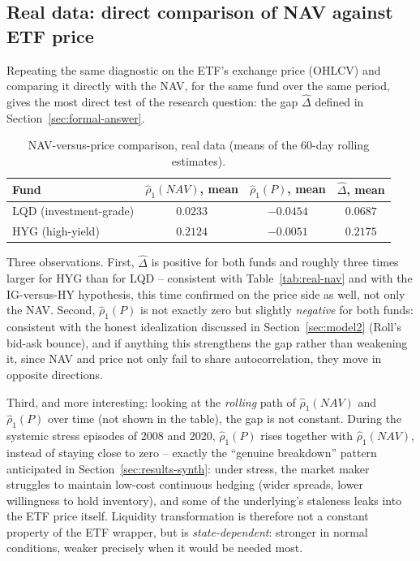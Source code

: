 \documentclass[11pt]{article}
\begin{document}
\subsection{Real data: direct comparison of NAV against ETF price}
\label{sec:results-gap}

Repeating the same diagnostic on the ETF's exchange price (OHLCV) and comparing it directly with the NAV, for the same fund over the same period, gives the most direct test of the research question: the gap $\widehat\Delta$ defined in Section~\ref{sec:formal-answer}.

\begin{table}[H]
\centering
\caption{NAV-versus-price comparison, real data (means of the 60-day rolling estimates).}
\label{tab:real-gap}
\begin{tabular}{lccc}
\toprule
Fund & $\hat\rho_1(NAV)$, mean & $\hat\rho_1(P)$, mean & $\widehat\Delta$, mean \\
\midrule
LQD (investment-grade) & $0.0233$ & $-0.0454$ & $0.0687$ \\
HYG (high-yield) & $0.2124$ & $-0.0051$ & $0.2175$ \\
\bottomrule
\end{tabular}
\end{table}

Three observations. First, $\widehat\Delta$ is positive for both funds and roughly three times larger for HYG than for LQD -- consistent with Table~\ref{tab:real-nav} and with the IG-versus-HY hypothesis, this time confirmed on the price side as well, not only the NAV. Second, $\hat\rho_1(P)$ is not exactly zero but slightly \emph{negative} for both funds: consistent with the honest idealization discussed in Section~\ref{sec:model2} (Roll's bid-ask bounce), and if anything this strengthens the gap rather than weakening it, since NAV and price not only fail to share autocorrelation, they move in opposite directions.

Third, and more interesting: looking at the \emph{rolling} path of $\hat\rho_1(NAV)$ and $\hat\rho_1(P)$ over time (not shown in the table), the gap is not constant. During the systemic stress episodes of 2008 and 2020, $\hat\rho_1(P)$ rises together with $\hat\rho_1(NAV)$, instead of staying close to zero -- exactly the ``genuine breakdown'' pattern anticipated in Section~\ref{sec:results-synth}: under stress, the market maker struggles to maintain low-cost continuous hedging (wider spreads, lower willingness to hold inventory), and some of the underlying's staleness leaks into the ETF price itself. Liquidity transformation is therefore not a constant property of the ETF wrapper, but is \emph{state-dependent}: stronger in normal conditions, weaker precisely when it would be needed most.
\end{document}
